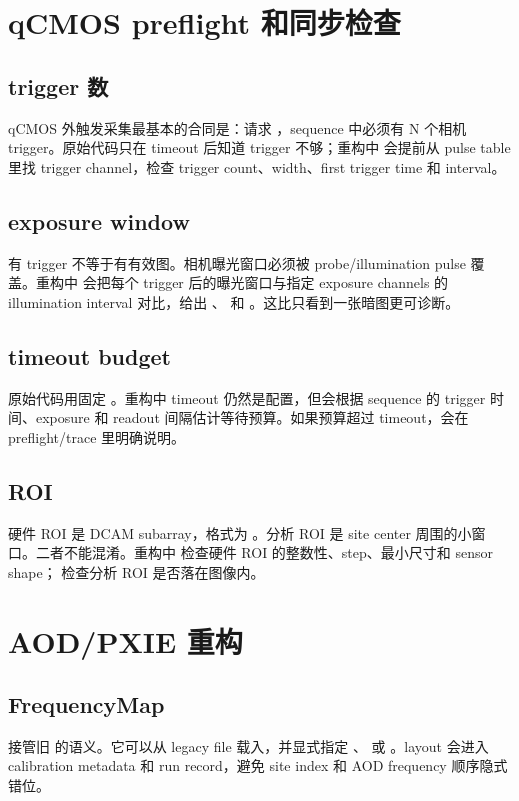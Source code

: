 \documentclass[11pt,oneside,openany]{book}
\begin{document}
\chapter{qCMOS preflight 和同步检查}
\section{trigger 数}
qCMOS 外触发采集最基本的合同是：请求 ，sequence 中必须有 N 个相机 trigger。原始代码只在 timeout 后知道 trigger 不够；重构中  会提前从 pulse table 里找 trigger channel，检查 trigger count、width、first trigger time 和 interval。

\section{exposure window}
有 trigger 不等于有有效图。相机曝光窗口必须被 probe/illumination pulse 覆盖。重构中  会把每个 trigger 后的曝光窗口与指定 exposure channels 的 illumination interval 对比，给出 、 和 。这比只看到一张暗图更可诊断。

\section{timeout budget}
原始代码用固定 。重构中 timeout 仍然是配置，但会根据 sequence 的 trigger 时间、exposure 和 readout 间隔估计等待预算。如果预算超过 timeout，会在 preflight/trace 里明确说明。

\section{ROI}
硬件 ROI 是 DCAM subarray，格式为 。分析 ROI 是 site center 周围的小窗口。二者不能混淆。重构中  检查硬件 ROI 的整数性、step、最小尺寸和 sensor shape； 检查分析 ROI 是否落在图像内。

\chapter{AOD/PXIE 重构}
\section{FrequencyMap}
 接管旧  的语义。它可以从 legacy file 载入，并显式指定 、 或 。layout 会进入 calibration metadata 和 run record，避免 site index 和 AOD frequency 顺序隐式错位。
\end{document}
